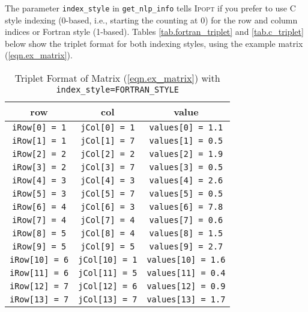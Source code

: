 \documentclass[10pt]{article}
\newcommand{\Ipopt}{\textsc{Ipopt}\xspace}
\begin{document}
The parameter {\tt index\_style} in {\tt get\_nlp\_info} tells \Ipopt if
you prefer to use C style indexing (0-based, i.e., starting the
counting at 0) for the row and column indices or Fortran style
(1-based). Tables \ref{tab.fortran_triplet} and \ref{tab.c_triplet}
below show the triplet format for both indexing styles, using the
example matrix (\ref{eqn.ex_matrix}).

\begin{footnotesize}
\begin{table}[ht]%
\begin{center}
\begin{tabular}{c c c}
row     		&       col     	&       value 			    \\
\hline
{\tt iRow[0] = 1}       &       {\tt jCol[0] = 1}       & {\tt values[0] = 1.1}     \\
{\tt iRow[1] = 1}       &       {\tt jCol[1] = 7}       & {\tt values[1] = 0.5}     \\
{\tt iRow[2] = 2}       &       {\tt jCol[2] = 2}       & {\tt values[2] = 1.9}     \\
{\tt iRow[3] = 2}       &       {\tt jCol[3] = 7}       & {\tt values[3] = 0.5}     \\
{\tt iRow[4] = 3}       &       {\tt jCol[4] = 3}       & {\tt values[4] = 2.6}     \\
{\tt iRow[5] = 3}       &       {\tt jCol[5] = 7}       & {\tt values[5] = 0.5}     \\
{\tt iRow[6] = 4}       &       {\tt jCol[6] = 3}       & {\tt values[6] = 7.8}     \\
{\tt iRow[7] = 4}       &       {\tt jCol[7] = 4}       & {\tt values[7] = 0.6}     \\
{\tt iRow[8] = 5}       &       {\tt jCol[8] = 4}       & {\tt values[8] = 1.5}     \\
{\tt iRow[9] = 5}       &       {\tt jCol[9] = 5}       & {\tt values[9] = 2.7}     \\
{\tt iRow[10] = 6}      &       {\tt jCol[10] = 1}      & {\tt values[10] = 1.6}     \\
{\tt iRow[11] = 6}      &       {\tt jCol[11] = 5}      & {\tt values[11] = 0.4}     \\
{\tt iRow[12] = 7}      &       {\tt jCol[12] = 6}      & {\tt values[12] = 0.9}     \\
{\tt iRow[13] = 7}      &       {\tt jCol[13] = 7}      & {\tt values[13] = 1.7}
\end{tabular}
\caption{Triplet Format of Matrix (\ref{eqn.ex_matrix}) 
with {\tt index\_style=FORTRAN\_STYLE}}

\end{center}
\end{table}
\end{footnotesize}
\end{document}

